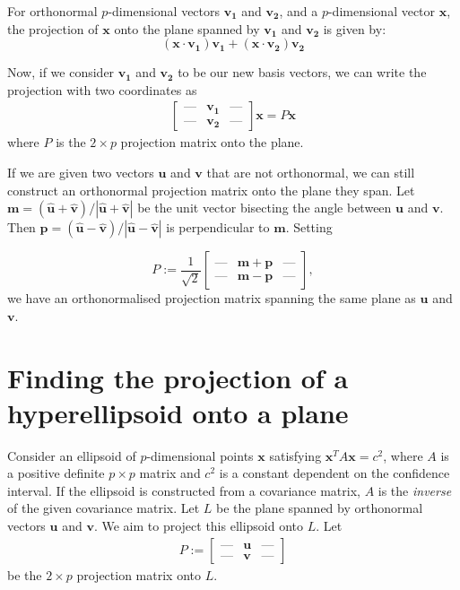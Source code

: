 \documentclass{article}
\renewcommand{\v}[1]{\boldsymbol{#1}}
\begin{document}
For orthonormal $p$-dimensional vectors $\v{v_1}$ and $\v{v_2}$, and a $p$-dimensional vector $\v{x}$, the projection of $\v{x}$ onto the plane spanned by $\v{v_1}$ and $\v{v_2}$ is given by:
\begin{equation}
    (\v{x}\cdot\v{v_1})\v{v_1}+(\v{x}\cdot\v{v_2})\v{v_2}
\end{equation}

Now, if we consider $\v{v_1}$ and $\v{v_2}$ to be our new basis vectors, we can write the projection with two coordinates as
\begin{align}
\begin{bmatrix}
    \text{---} & \v{v_1} & \text{---}  \\
    \text{---} & \v{v_2} & \text{---}
\end{bmatrix}
\v{x} = P \v{x}
\end{align}
where $P$ is the $2 \times p$ projection matrix onto the plane. 

If we are given two vectors $\v{u}$ and $\v{v}$ that are not orthonormal, we can still construct an orthonormal projection matrix onto the plane they span. Let $\v{m} = (\v{\hat{u}} + \v{\hat{v}})/|\v{\hat{u}} + \v{\hat{v}}|$ be the unit vector bisecting the angle between $\v{u}$ and $\v{v}$. Then $\v{p} = (\v{\hat{u}} - \v{\hat{v}})/|\v{\hat{u}} - \v{\hat{v}}|$ is perpendicular to $\v{m}$. Setting

\begin{equation}
P := \frac{1}{\sqrt{2}}
\begin{bmatrix}
    \text{---} & \v{m} + \v{p} & \text{---}  \\
    \text{---} & \v{m} - \v{p} & \text{---}
\end{bmatrix},
\end{equation}
we have an orthonormalised projection matrix spanning the same plane as $\v{u}$ and $\v{v}$.

\section{Finding the projection of a hyperellipsoid onto a plane}

Consider an ellipsoid of $p$-dimensional points $\v{x}$ satisfying $\v{x}^T A \v{x} = c^2$, where $A$ is a positive definite $p \times p$ matrix and $c^2$ is a constant dependent on the confidence interval. If the ellipsoid is constructed from a covariance matrix, $A$ is the \emph{inverse} of the given covariance matrix. Let $L$ be the plane spanned by orthonormal vectors $\v{u}$ and $\v{v}$. We aim to project this ellipsoid onto $L$. Let
\begin{align}
P:=
\begin{bmatrix}
    \text{---} & \v{u} & \text{---}  \\
    \text{---} & \v{v} & \text{---}
\end{bmatrix}
\end{align}
be the $2 \times p$ projection matrix onto $L$.
\end{document}
